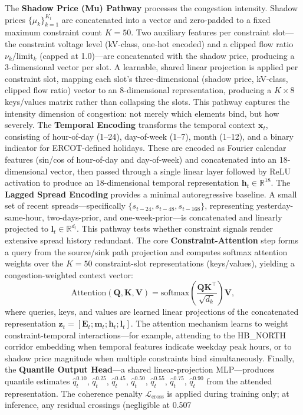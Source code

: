The \textbf{Shadow Price (Mu) Pathway} processes the congestion intensity. Shadow prices $\{\mu_k\}_{k=1}^{K_t}$ are concatenated into a vector and zero-padded to a fixed maximum constraint count $K = 50$. Two auxiliary features per constraint slot---the constraint voltage level (kV-class, one-hot encoded) and a clipped flow ratio $\nu_k / \text{limit}_k$ (capped at 1.0)---are concatenated with the shadow price, producing a 3-dimensional vector per slot. A learnable, shared linear projection is applied per constraint slot, mapping each slot's three-dimensional (shadow price, kV-class, clipped flow ratio) vector to an 8-dimensional representation, producing a $K\times 8$ keys/values matrix rather than collapsing the slots. This pathway captures the intensity dimension of congestion: not merely which elements bind, but how severely.
The \textbf{Temporal Encoding} transforms the temporal context $\mathbf{x}_t$, consisting of hour-of-day (1--24), day-of-week (1--7), month (1--12), and a binary indicator for ERCOT-defined holidays. These are encoded as Fourier calendar features (sin/cos of hour-of-day and day-of-week) and concatenated into an 18-dimensional vector, then passed through a single linear layer followed by ReLU activation to produce an 18-dimensional temporal representation $\mathbf{h}_t \in \mathbb{R}^{18}$.
The \textbf{Lagged Spread Encoding} provides a minimal autoregressive baseline. A small set of recent spreads---specifically $\{s_{t-24}, s_{t-48}, s_{t-168}\}$, representing yesterday-same-hour, two-days-prior, and one-week-prior---is concatenated and linearly projected to $\mathbf{l}_t \in \mathbb{R}^{d_l}$. This pathway tests whether constraint signals render extensive spread history redundant.
The core \textbf{Constraint-Attention} step forms a query from the source/sink path projection and computes softmax attention weights over the $K=50$ constraint-slot representations (keys/values), yielding a congestion-weighted context vector:
$$\text{Attention}(\mathbf{Q}, \mathbf{K}, \mathbf{V}) = \text{softmax}\!\left(\frac{\mathbf{Q}\mathbf{K}^\top}{\sqrt{d_k}}\right)\mathbf{V},$$
where queries, keys, and values are learned linear projections of the concatenated representation $\mathbf{z}_t = [\mathbf{E}_t; \mathbf{m}_t; \mathbf{h}_t; \mathbf{l}_t]$. The attention mechanism learns to weight constraint-temporal interactions---for example, attending to the HB_NORTH corridor embedding when temporal features indicate weekday peak hours, or to shadow price magnitude when multiple constraints bind simultaneously.
Finally, the \textbf{Quantile Output Head}---a shared linear-projection MLP---produces quantile estimates $\hat{q}_t^{0.10}$, $\hat{q}_t^{0.25}$, $\hat{q}_t^{0.45}$, $\hat{q}_t^{0.50}$, $\hat{q}_t^{0.55}$, $\hat{q}_t^{0.75}$, $\hat{q}_t^{0.90}$ from the attended representation. The coherence penalty $\mathcal{L}_{\text{cross}}$ is applied during training only; at inference, any residual crossings (negligible at 0.507%

